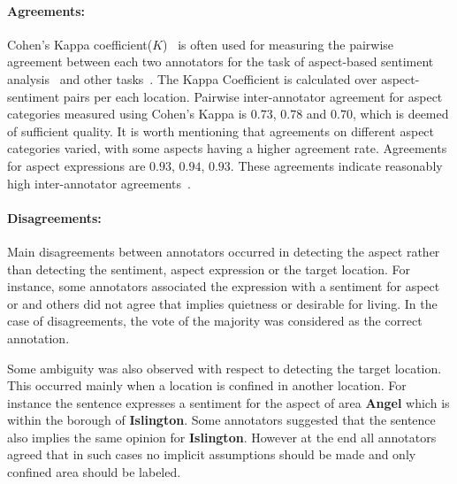 \documentclass[11pt]{article}
\begin{document}
        \paragraph{Agreements:} 
         Cohen's Kappa coefficient($K$)~\cite{cohen1960} is often used for measuring the pairwise agreement between each two annotators for the task of aspect-based sentiment analysis~\cite{gamon2005pulse,ganu2009beyond} and other tasks~\cite{liakata2010corpora}. The Kappa Coefficient is calculated over aspect-sentiment pairs per each location. Pairwise inter-annotator agreement for aspect categories measured using Cohen's Kappa is $0.73$, $0.78$ and $0.70$, which is deemed of sufficient quality. It is worth mentioning that agreements on different aspect categories varied, with some aspects having a higher agreement rate.
         Agreements for aspect expressions are $0.93$, $0.94$, $0.93$. These agreements indicate reasonably high inter-annotator agreements~\cite{pavlopoulos2014aspect}.
         
         \paragraph{Disagreements:}
         Main disagreements between annotators occurred in detecting the aspect rather than detecting the sentiment, aspect expression or the target location. For instance, some annotators associated the expression  with a  sentiment for aspect  or  and others did not agree that  implies quietness or desirable for living. In the case of disagreements, the vote of the majority was considered as the correct annotation.
         
         Some ambiguity was also observed with respect to detecting the target location. This occurred mainly when a location is confined in another location. For instance the sentence  expresses a  sentiment for the aspect  of area \textbf{Angel} which is within the borough of \textbf{Islington}. Some annotators suggested that the sentence also implies the same opinion for \textbf{Islington}. However at the end all annotators agreed that in such cases no implicit assumptions should be made and only confined area should be labeled.
         
\end{document}
